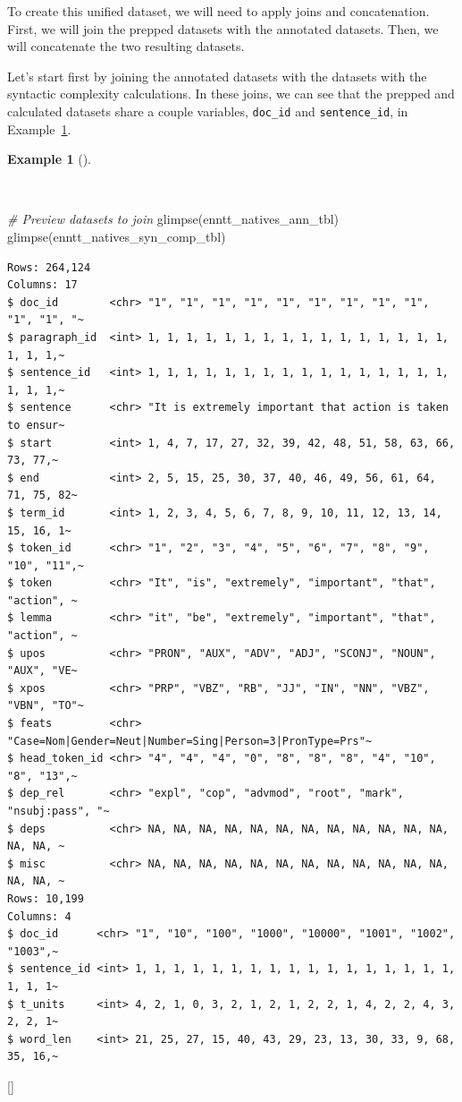 \documentclass[
  letterpaper,
  krantz1]{latex/krantz-mod}
\newenvironment{Shaded}{\begin{snugshade}}{\end{snugshade}}
\newcommand{\CommentTok}[1]{\textcolor[rgb]{0.00,0.00,0.00}{\textit{#1}}}
\newcommand{\FunctionTok}[1]{\textcolor[rgb]{0.00,0.00,0.00}{#1}}
\newcommand{\NormalTok}[1]{\textcolor[rgb]{0.00,0.00,0.00}{#1}}
\newcommand{\cindex}[1]{%
  \StrSubstitute{#1}{_}{\_}[\temp]%
  \index{\temp}%
}
\theoremstyle{definition}
\theoremstyle{definition}
\newtheorem{example}{Example}[chapter]
\theoremstyle{remark}
\begin{document}
To create this unified dataset, we will need to apply joins and
concatenation. First, we will join the prepped datasets with the
annotated datasets. Then, we will concatenate the two resulting
datasets.

Let's start first by joining the annotated datasets with the datasets
with the syntactic complexity calculations. In these joins, we can see
that the prepped and calculated datasets share a couple variables,
\texttt{doc\_id} and \texttt{sentence\_id}, in
Example~\ref{exm-transform-merging-join-prepped-syn-comp}.

\begin{example}[]\protect\hypertarget{exm-transform-merging-join-prepped-syn-comp}{}\label{exm-transform-merging-join-prepped-syn-comp}

~

\begin{Shaded}
\begin{Highlighting}[numbers=left,,]
\CommentTok{\# Preview datasets to join}
\FunctionTok{glimpse}\NormalTok{(enntt\_natives\_ann\_tbl)}
\FunctionTok{glimpse}\NormalTok{(enntt\_natives\_syn\_comp\_tbl)}
\end{Highlighting}
\end{Shaded}

\begin{verbatim}
Rows: 264,124
Columns: 17
$ doc_id        <chr> "1", "1", "1", "1", "1", "1", "1", "1", "1", "1", "1", "~
$ paragraph_id  <int> 1, 1, 1, 1, 1, 1, 1, 1, 1, 1, 1, 1, 1, 1, 1, 1, 1, 1, 1,~
$ sentence_id   <int> 1, 1, 1, 1, 1, 1, 1, 1, 1, 1, 1, 1, 1, 1, 1, 1, 1, 1, 1,~
$ sentence      <chr> "It is extremely important that action is taken to ensur~
$ start         <int> 1, 4, 7, 17, 27, 32, 39, 42, 48, 51, 58, 63, 66, 73, 77,~
$ end           <int> 2, 5, 15, 25, 30, 37, 40, 46, 49, 56, 61, 64, 71, 75, 82~
$ term_id       <int> 1, 2, 3, 4, 5, 6, 7, 8, 9, 10, 11, 12, 13, 14, 15, 16, 1~
$ token_id      <chr> "1", "2", "3", "4", "5", "6", "7", "8", "9", "10", "11",~
$ token         <chr> "It", "is", "extremely", "important", "that", "action", ~
$ lemma         <chr> "it", "be", "extremely", "important", "that", "action", ~
$ upos          <chr> "PRON", "AUX", "ADV", "ADJ", "SCONJ", "NOUN", "AUX", "VE~
$ xpos          <chr> "PRP", "VBZ", "RB", "JJ", "IN", "NN", "VBZ", "VBN", "TO"~
$ feats         <chr> "Case=Nom|Gender=Neut|Number=Sing|Person=3|PronType=Prs"~
$ head_token_id <chr> "4", "4", "4", "0", "8", "8", "8", "4", "10", "8", "13",~
$ dep_rel       <chr> "expl", "cop", "advmod", "root", "mark", "nsubj:pass", "~
$ deps          <chr> NA, NA, NA, NA, NA, NA, NA, NA, NA, NA, NA, NA, NA, NA, ~
$ misc          <chr> NA, NA, NA, NA, NA, NA, NA, NA, NA, NA, NA, NA, NA, NA, ~
Rows: 10,199
Columns: 4
$ doc_id      <chr> "1", "10", "100", "1000", "10000", "1001", "1002", "1003",~
$ sentence_id <int> 1, 1, 1, 1, 1, 1, 1, 1, 1, 1, 1, 1, 1, 1, 1, 1, 1, 1, 1, 1~
$ t_units     <int> 4, 2, 1, 0, 3, 2, 1, 2, 1, 2, 2, 1, 4, 2, 2, 4, 3, 2, 2, 1~
$ word_len    <int> 21, 25, 27, 15, 40, 43, 29, 23, 13, 30, 33, 9, 68, 35, 16,~
\end{verbatim}

\cindex{slice_head()}

\end{example}
\end{document}
